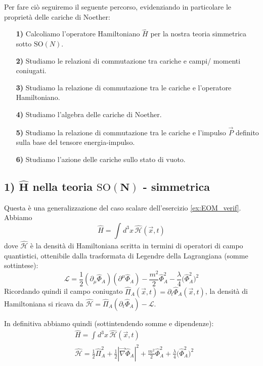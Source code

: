 \documentclass[../main.tex]{subfiles}
\begin{document}
Per fare ciò seguiremo il seguente percorso, evidenziando in particolare le proprietà delle cariche di Noether:
\begin{enumerate}
    \item[\textbf{1)}] Calcoliamo l'operatore Hamiltoniano $\hat{H}$ per la nostra teoria simmetrica sotto $\textrm{SO}(N)$.

    \item[\textbf{2)}] Studiamo le relazioni di commutazione tra cariche e campi/ momenti coniugati.

    \item[\textbf{3)}] Studiamo la relazione di commutazione tra le cariche e l'operatore Hamiltoniano.
    
    \item[\textbf{4)}] Studiamo l'algebra delle cariche di Noether.
    
    \item[\textbf{5)}] Studiamo la relazione di commutazione tra le cariche e l'impulso $\Vec{P}$ definito sulla base del tensore energia-impulso.
    
    \item[\textbf{6)}] Studiamo l'azione delle cariche sullo stato di vuoto.
\end{enumerate}

\subsection[$\hat{H}$ nella teoria $\textrm{SO}(N)$-simm]{1) $\hat{\mathbf{H}}$ nella teoria $\textrm{SO}\mathbf{(N)}$ - simmetrica}

Questa è una generalizzazione del caso scalare dell'esercizio \ref{ex:EOM_verif}. Abbiamo
\[
\hat{H} = \int_{} d^3x\, \hat{\mathscr{H}}(\Vec{x}, t)
\]
dove $\hat{\mathscr{H}}$ è la densità di Hamiltoniana scritta in termini di operatori di campo quantistici, ottenibile dalla trasformata di Legendre della Lagrangiana (somme sottintese):
\[
\mathscr{L} = \frac{1}{2}(\partial_\mu\hat{\Phi}_A)(\partial^\mu\hat{\Phi}_A) - \frac{m^2}{2}\hat{\Phi}_A^2 - \frac{\lambda}{4}\big(\hat{\Phi}_A^2\big)^2
\]
Ricordando quindi il campo coniugato $\hat{\Pi}_A(\Vec{x}, t) = \partial_t \hat{\Phi}_A(\Vec{x}, t)$, la densità di Hamiltoniana si ricava da \(\hat{\mathscr{H}} = \hat{\Pi}_A(\partial_t \hat{\Phi}_A) - \mathscr{L}\).

In definitiva abbiamo quindi (sottintendendo somme e dipendenze):
\begin{equation}
    \boxed{
    \begin{aligned}
        &\hat{H} = \int_{} d^3x\, \hat{\mathscr{H}}(\Vec{x}, t) \\
        &\hat{\mathscr{H}} = \frac{1}{2}\hat{\Pi}_A^2 + \frac{1}{2}|\Vec{\nabla}\hat{\Phi}_A|^2 + \frac{m^2}{2}\hat{\Phi}_A^2 + \frac{\lambda}{4}\big(\hat{\Phi}_A^2\big)^2
    \end{aligned}}
    \label{eq:hamilt_operator_and_density}
\end{equation}
\end{document}
